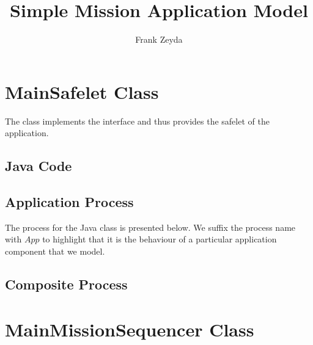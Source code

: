 \documentclass{article}
\title{Simple Mission Application Model}
\author{Frank Zeyda}
\begin{document}
\maketitle

\tableofcontents

\newpage


\section{MainSafelet Class}

The  class implements the  interface and thus provides the safelet of the application.

\subsection{Java Code}


\subsection{Application Process}

The process for the  Java class is presented below. We suffix the process name with $App$ to highlight that it is the behaviour of a particular application component that we model.

\begin{circusbox}

\end{circusbox}

\subsection{Composite Process}


\begin{circusbox}

\end{circusbox}


\section{MainMissionSequencer Class}
\end{document}
